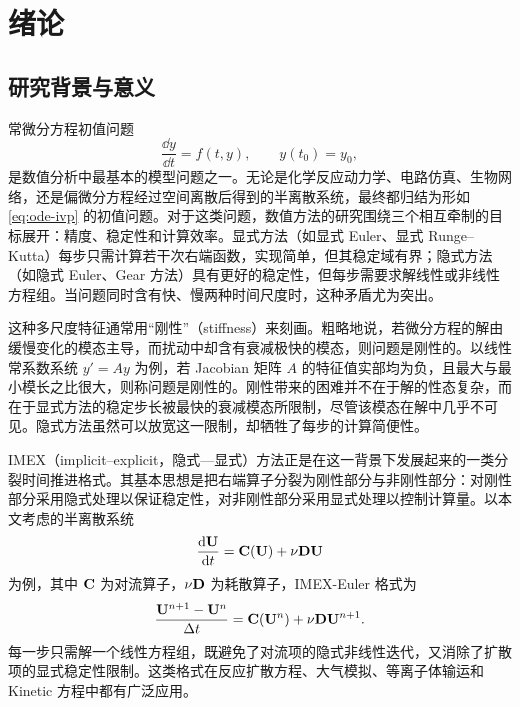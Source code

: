 \chapter{绪论}
\pagestyle{fancy}

\section{研究背景与意义}

常微分方程初值问题
\begin{equation}
  \frac{\dd y}{\dd t}=f(t,y),\qquad y(t_0)=y_0,
  \label{eq:ode-ivp}
\end{equation}
是数值分析中最基本的模型问题之一。无论是化学反应动力学、电路仿真、生物网络，还是偏微分方程经过空间离散后得到的半离散系统，最终都归结为形如 \eqref{eq:ode-ivp} 的初值问题。对于这类问题，数值方法的研究围绕三个相互牵制的目标展开：精度、稳定性和计算效率。显式方法（如显式 Euler、显式 Runge--Kutta）每步只需计算若干次右端函数，实现简单，但其稳定域有界；隐式方法（如隐式 Euler、Gear 方法）具有更好的稳定性，但每步需要求解线性或非线性方程组。当问题同时含有快、慢两种时间尺度时，这种矛盾尤为突出。

这种多尺度特征通常用“刚性”（stiffness）来刻画。粗略地说，若微分方程的解由缓慢变化的模态主导，而扰动中却含有衰减极快的模态，则问题是刚性的。以线性常系数系统 $y'=Ay$ 为例，若 Jacobian 矩阵 $A$ 的特征值实部均为负，且最大与最小模长之比很大，则称问题是刚性的。刚性带来的困难并不在于解的性态复杂，而在于显式方法的稳定步长被最快的衰减模态所限制，尽管该模态在解中几乎不可见。隐式方法虽然可以放宽这一限制，却牺牲了每步的计算简便性。

IMEX（implicit--explicit，隐式—显式）方法正是在这一背景下发展起来的一类分裂时间推进格式。其基本思想是把右端算子分裂为刚性部分与非刚性部分：对刚性部分采用隐式处理以保证稳定性，对非刚性部分采用显式处理以控制计算量。以本文考虑的半离散系统
\begin{equation}
  \frac{\mathrm{d} {\mathbf{U}}}{\mathrm{d} t}={\mathbf{C}}({\mathbf{U}})+\nu{\mathbf{D}}{\mathbf{U}}
  \label{eq:semidiscrete-intro}
\end{equation}
为例，其中 ${\mathbf{C}}$ 为对流算子，$\nu{\mathbf{D}}$ 为耗散算子，IMEX-Euler 格式为
\begin{equation}
  \frac{{\mathbf{U}}^{n+1}-{\mathbf{U}}^{n}}{\Delta t}
  ={\mathbf{C}}({\mathbf{U}}^{n})+\nu{\mathbf{D}}{\mathbf{U}}^{n+1}.
  \label{eq:imex-euler-intro}
\end{equation}
每一步只需解一个线性方程组，既避免了对流项的隐式非线性迭代，又消除了扩散项的显式稳定性限制。这类格式在反应扩散方程、大气模拟、等离子体输运和 Kinetic 方程中都有广泛应用。

